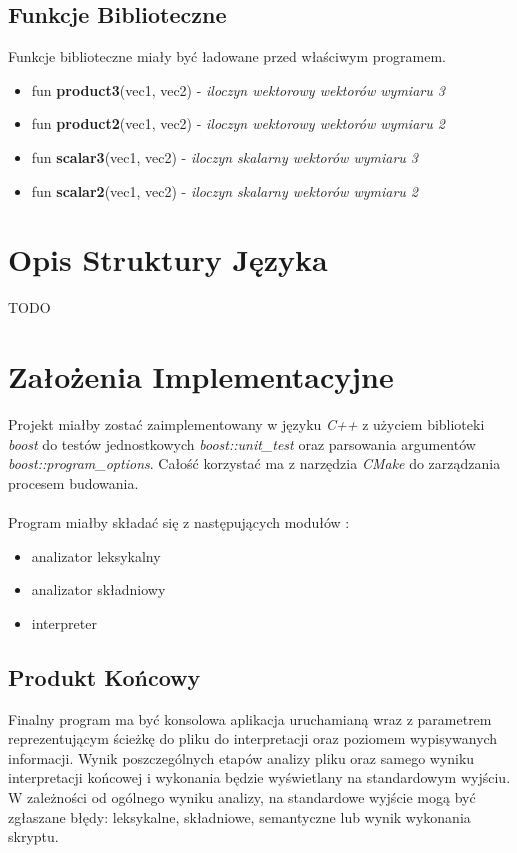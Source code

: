 \documentclass[11pt]{article} %
\begin{document}
\subsection{Funkcje Biblioteczne}
Funkcje biblioteczne miały być ładowane przed właściwym programem.
\begin{itemize}
	\item fun \textbf{product3}(vec1, vec2) - \textit{iloczyn wektorowy wektorów wymiaru 3}
	\item fun \textbf{product2}(vec1, vec2) - \textit{iloczyn wektorowy wektorów wymiaru 2}
	\item fun \textbf{scalar3}(vec1, vec2) - \textit{iloczyn skalarny wektorów wymiaru 3}
	\item fun \textbf{scalar2}(vec1, vec2) - \textit{iloczyn skalarny wektorów wymiaru 2}
\end{itemize}

\section{Opis Struktury Języka}

TODO

\section{Założenia Implementacyjne}
Projekt miałby zostać zaimplementowany w języku \textit{C++} z użyciem biblioteki \textit{boost} do testów jednostkowych \textit{boost::unit\_test} oraz parsowania argumentów \textit{boost::program\_options}. Całość korzystać ma z narzędzia \textit{CMake} do zarządzania procesem budowania.
\paragraph{}
Program miałby składać się z następujących modułów : 
\begin{itemize}
	\item analizator leksykalny
	\item analizator składniowy
	\item interpreter
\end{itemize}
\subsection{Produkt Końcowy}
Finalny program ma być konsolowa aplikacja uruchamianą wraz z parametrem reprezentującym ścieżkę do pliku do interpretacji oraz poziomem wypisywanych informacji. Wynik poszczególnych etapów analizy pliku oraz samego wyniku interpretacji końcowej i wykonania będzie wyświetlany na standardowym wyjściu. W zależności od ogólnego wyniku analizy, na standardowe wyjście mogą być zgłaszane błędy: leksykalne, składniowe, semantyczne lub wynik wykonania skryptu.
\end{document}
